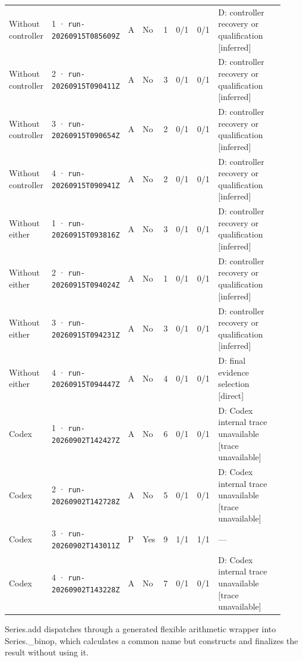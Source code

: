 \begin{landscape}
\begin{longtable}{@{}L{0.11\linewidth}L{0.16\linewidth}*{1}{L{0.022\linewidth}}L{0.05\linewidth}L{0.045\linewidth}L{0.08\linewidth}L{0.085\linewidth}L{0.368\linewidth}@{}}
Without controller & 1 · \texttt{run-20260915\allowbreak T085609Z} & A & No & 1 & 0/1 & 0/1 & D: controller recovery or qualification [inferred] \\
Without controller & 2 · \texttt{run-20260915\allowbreak T090411Z} & A & No & 3 & 0/1 & 0/1 & D: controller recovery or qualification [inferred] \\
Without controller & 3 · \texttt{run-20260915\allowbreak T090654Z} & A & No & 2 & 0/1 & 0/1 & D: controller recovery or qualification [inferred] \\
Without controller & 4 · \texttt{run-20260915\allowbreak T090941Z} & A & No & 2 & 0/1 & 0/1 & D: controller recovery or qualification [inferred] \\
Without either & 1 · \texttt{run-20260915\allowbreak T093816Z} & A & No & 3 & 0/1 & 0/1 & D: controller recovery or qualification [inferred] \\
Without either & 2 · \texttt{run-20260915\allowbreak T094024Z} & A & No & 1 & 0/1 & 0/1 & D: controller recovery or qualification [inferred] \\
Without either & 3 · \texttt{run-20260915\allowbreak T094231Z} & A & No & 3 & 0/1 & 0/1 & D: controller recovery or qualification [inferred] \\
Without either & 4 · \texttt{run-20260915\allowbreak T094447Z} & A & No & 4 & 0/1 & 0/1 & D: final evidence selection [direct] \\
Codex & 1 · \texttt{run-20260902\allowbreak T142427Z} & A & No & 6 & 0/1 & 0/1 & D: Codex internal trace unavailable [trace unavailable] \\
Codex & 2 · \texttt{run-20260902\allowbreak T142728Z} & A & No & 5 & 0/1 & 0/1 & D: Codex internal trace unavailable [trace unavailable] \\
Codex & 3 · \texttt{run-20260902\allowbreak T143011Z} & P & Yes & 9 & 1/1 & 1/1 & --- \\
Codex & 4 · \texttt{run-20260902\allowbreak T143228Z} & A & No & 7 & 0/1 & 0/1 & D: Codex internal trace unavailable [trace unavailable] \\
\end{longtable}
\endgroup
\end{landscape}

\label{sec:pandas-dev-pandas-10068}

Series.add dispatches through a generated flexible arithmetic wrapper into Series.\_binop, which calculates a common name but constructs and finalizes the result without using it.

